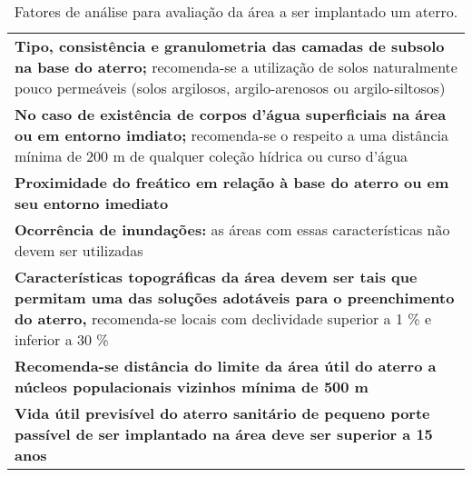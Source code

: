 \begin{table}[htbp]
  \centering
  \caption{Fatores de análise para avaliação da área a ser implantado um aterro.}
    \begin{tabular}{P{40.955em}}
     \textbf{Tipo, consistência e granulometria das camadas de subsolo na base do aterro;} recomenda-se a utilização de solos naturalmente pouco permeáveis (solos argilosos, argilo-arenosos ou argilo-siltosos) \\
    \textbf{ No caso de existência de corpos d'água superficiais na área ou em entorno imdiato;} recomenda-se o respeito a uma distância mínima de 200 m de qualquer coleção hídrica ou curso d'água \\
     \textbf{Proximidade do freático em relação à base do aterro ou em seu entorno imediato} \\
     \textbf{Ocorrência de inundações:} as áreas com essas características não devem ser utilizadas \\
    \textbf{ Características topográficas da área devem ser tais que permitam uma das soluções adotáveis para o preenchimento do aterro,} recomenda-se locais com declividade superior a 1 \% e inferior a 30 \% \\
    \textbf{ Recomenda-se distância do limite da área útil do aterro a núcleos populacionais vizinhos mínima de 500 m} \\
     \textbf{Vida útil previsível do aterro sanitário de pequeno porte passível de ser implantado na área deve ser superior a 15 anos} \\
    \end{tabular}%
  \label{tab:fatores_aterro}%
\end{table}%
